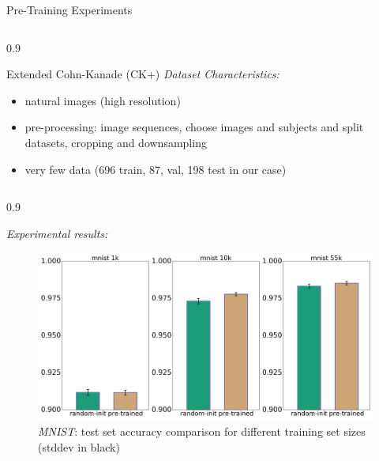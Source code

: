 \documentclass[final]{beamer}
\newlength{\onecolwid}
\newlength{\threecolwid}
\begin{document}
\begin{frame}[t]
\begin{columns}[t]
\begin{column}{\threecolwid}
\begin{alertblock}{Pre-Training Experiments}
\begin{columns}[t, totalwidth=0.9\threecolwid]
\begin{column}{0.9\onecolwid}
\begin{block}{Extended Cohn-Kanade (CK+)}
\emph{Dataset Characteristics:}\\
\begin{itemize}
	\item natural images (high resolution) 
	\item pre-processing: image sequences, choose images and subjects and split datasets, cropping and downsampling
	\item very few data (696 train, 87, val, 198 test in our case)


\end{itemize}

\end{block}

\end{column}

\end{columns}


\begin{columns}[t, totalwidth=0.9\threecolwid] %


\begin{column}{0.9\onecolwid} %
\begin{block}{}
\emph{Experimental results:}

\begin{figure}
\includegraphics[width=\linewidth]{box_plots/boxplots_mnist.png}
\caption{\emph{MNIST}: test set accuracy comparison for different training set sizes (stddev in black)}
\end{figure}


\end{block}
\end{column}
\end{columns}
\end{alertblock}
\end{column}
\end{columns}
\end{frame}
\end{document}
